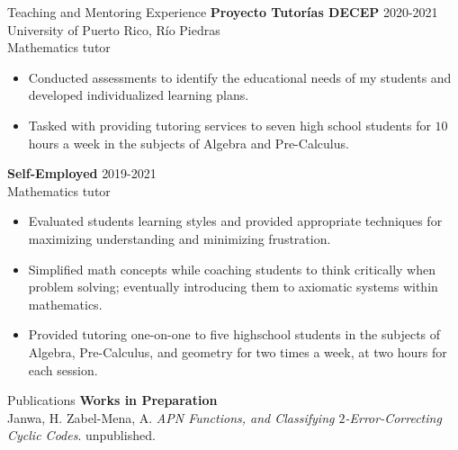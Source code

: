 \documentclass{resume} %
\begin{document}
\begin{rSection}{Teaching and Mentoring Experience}
    \textbf{Proyecto Tutor\'ias DECEP} \hfill{2020-2021} \\
    University of Puerto Rico, R\'io Piedras \\
    Mathematics tutor
    \begin{itemize}
        \item Conducted assessments to identify the educational needs of my
            students and developed individualized learning plans.

        \item Tasked with providing tutoring services to seven high school
            students for $10$ hours a week in the subjects of Algebra and
            Pre-Calculus.
    \end{itemize}

    \textbf{Self-Employed} \hfill{2019-2021} \\
    Mathematics tutor

    \begin{itemize}
        \item Evaluated students learning styles and provided appropriate
            techniques for maximizing understanding and minimizing frustration.

        \item Simplified math concepts while coaching students to think
            critically when problem solving; eventually introducing them to
            axiomatic systems within mathematics.

        \item Provided tutoring one-on-one to five highschool students in the
            subjects of Algebra, Pre-Calculus, and geometry for two times a
            week, at two hours for each session.
    \end{itemize}
\end{rSection}

\begin{rSection}{Publications}
    \textbf{Works in Preparation} \\
    \hspace*{10mm} Janwa, H. Zabel-Mena, A. \textit{APN Functions, and Classifying
    $2$-Error-Correcting Cyclic Codes}.
    \hspace*{10mm} unpublished.


\end{rSection}
\end{document}
